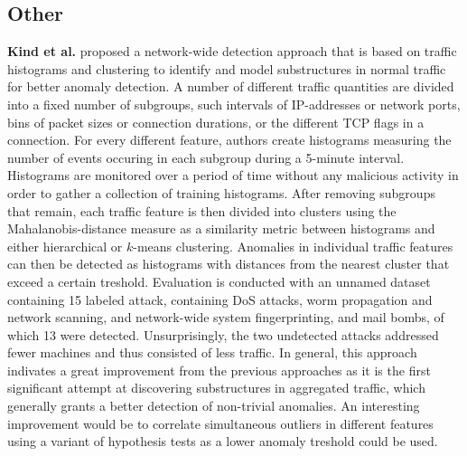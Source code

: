 \documentclass[a4paper,12pt,twoside]{report}
\begin{document}
\subsection{Other}

\textbf{Kind et al.} \cite{kind2009histogram} proposed a network-wide detection approach that is based on traffic histograms and clustering to identify and model substructures in normal traffic for better anomaly detection. A number of different traffic quantities are divided into a fixed number of subgroups, such intervals of IP-addresses or network ports, bins of packet sizes or connection durations, or the different TCP flags in a connection. For every different feature, authors create histograms measuring the number of events occuring in each subgroup during a 5-minute interval. Histograms are monitored over a period of time without any malicious activity in order to gather a collection of training histograms. After removing subgroups that remain, each traffic feature is then divided into clusters using the Mahalanobis-distance measure as a similarity metric between histograms and either hierarchical or $k$-means clustering. Anomalies in individual traffic features can then be detected as histograms with distances from the nearest cluster that exceed a certain treshold. Evaluation is conducted with an unnamed dataset containing 15 labeled attack, containing DoS attacks, worm propagation and network scanning, and network-wide system fingerprinting, and mail bombs, of which 13 were detected. Unsurprisingly, the two undetected attacks addressed fewer machines and thus consisted of less traffic. In general, this approach indivates a great improvement from the previous approaches as it is the first significant attempt at discovering substructures in aggregated traffic, which generally grants a better detection of non-trivial anomalies. An interesting improvement would be to correlate simultaneous outliers in different features using a variant of hypothesis tests as a lower anomaly treshold could be used.
\end{document}
